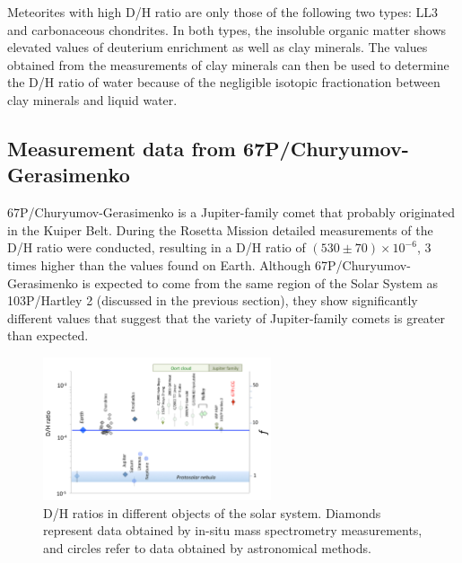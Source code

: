 Meteorites with high D/H ratio are only those of the following two types: LL3 and carbonaceous chondrites. In both types, the insoluble organic matter shows elevated values of deuterium enrichment as well as clay minerals. The values obtained from the measurements of clay minerals can then be used to determine the D/H ratio of water because of the negligible isotopic fractionation between clay minerals and liquid water. \cite{SolSystemDH_Robert}


\newpage
\subsection{Measurement data from 67P/Churyumov-Gerasimenko}
67P/Churyumov-Gerasimenko is a Jupiter-family comet that probably originated in the Kuiper Belt. During the Rosetta Mission detailed measurements of the D/H ratio were conducted, resulting in a D/H ratio of $(530 \pm 70)\times10^{-6}$, 3 times higher than the values found on Earth. Although 67P/Churyumov-Gerasimenko is expected to come from the same region of the Solar System as 103P/Hartley 2 (discussed in the previous section), they show significantly different values that suggest that the variety of Jupiter-family comets is greater than expected.  

\begin{figure}
	\centering
	\includegraphics[width=0.6\textwidth]{figures/D_H_ratio_multiple_objects}
	\caption{D/H ratios in different objects of the solar system. Diamonds represent data obtained by in-situ mass spectrometry measurements, and circles refer to data obtained by astronomical methods. \cite{D/H_67P_science}}
	\label{fig::D/H_different_objects}
\end{figure}

